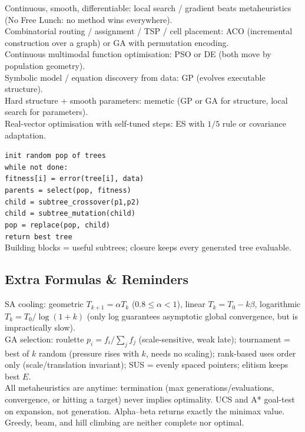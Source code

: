Continuous, smooth, differentiable: local search / gradient beats metaheuristics (No Free Lunch: no method wins everywhere).\\
Combinatorial routing / assignment / TSP / cell placement: ACO (incremental construction over a graph) or GA with permutation encoding.\\
Continuous multimodal function optimisation: PSO or DE (both move by population geometry).\\
Symbolic model / equation discovery from data: GP (evolves executable structure).\\
Hard structure + smooth parameters: memetic (GP or GA for structure, local search for parameters).\\
Real-vector optimisation with self-tuned steps: ES with \(1/5\) rule or covariance adaptation.

\texttt{init random pop of trees}\\
\texttt{while not done:}\\
\quad\texttt{fitness[i] = error(tree[i], data)}\\
\quad\texttt{parents = select(pop, fitness)}\\
\quad\texttt{child = subtree\_crossover(p1,p2)}\\
\quad\texttt{child = subtree\_mutation(child)}\\
\quad\texttt{pop = replace(pop, child)}\\
\texttt{return best tree}\\
Building blocks = useful subtrees; closure keeps every generated tree evaluable.

\subsection*{Extra Formulas \& Reminders}
SA cooling: geometric \(T_{k+1}=\alpha T_k\) (\(0.8\le\alpha<1\)), linear \(T_k=T_0-k\beta\), logarithmic \(T_k=T_0/\log(1+k)\) (only log guarantees asymptotic global convergence, but is impractically slow).\\
GA selection: roulette \(p_i=f_i/\sum_j f_j\) (scale-sensitive, weak late); tournament = best of \(k\) random (pressure rises with \(k\), needs no scaling); rank-based uses order only (scale/translation invariant); SUS = evenly spaced pointers; elitism keeps best \(E\).\\
All metaheuristics are anytime: termination (max generations/evaluations, convergence, or hitting a target) never implies optimality. UCS and A* goal-test on expansion, not generation. Alpha--beta returns exactly the minimax value. Greedy, beam, and hill climbing are neither complete nor optimal.
